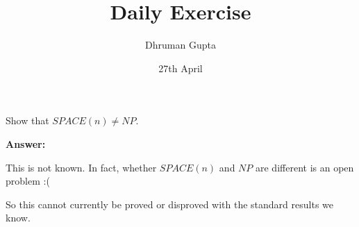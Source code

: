 \documentclass[11pt]{article}
\title{Daily Exercise}
\author{Dhruman Gupta}
\date{27th April}
\begin{document}

Show that $SPACE(n) \neq NP$.

\textbf{Answer:}

This is not known. In fact, whether $SPACE(n)$ and $NP$ are different is an open problem :(

So this cannot currently be proved or disproved with the standard results we know.
\end{document}
